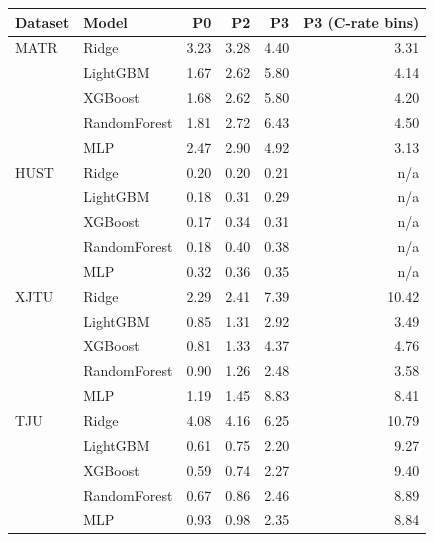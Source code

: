 \begin{tabular}{llrrrr}
\toprule
Dataset & Model & P0 & P2 & P3 & P3 (C-rate bins) \\
\midrule
MATR & Ridge & 3.23 & 3.28 & 4.40 & 3.31 \\
 & LightGBM & 1.67 & 2.62 & 5.80 & 4.14 \\
 & XGBoost & 1.68 & 2.62 & 5.80 & 4.20 \\
 & RandomForest & 1.81 & 2.72 & 6.43 & 4.50 \\
 & MLP & 2.47 & 2.90 & 4.92 & 3.13 \\
HUST & Ridge & 0.20 & 0.20 & 0.21 & n/a \\
 & LightGBM & 0.18 & 0.31 & 0.29 & n/a \\
 & XGBoost & 0.17 & 0.34 & 0.31 & n/a \\
 & RandomForest & 0.18 & 0.40 & 0.38 & n/a \\
 & MLP & 0.32 & 0.36 & 0.35 & n/a \\
XJTU & Ridge & 2.29 & 2.41 & 7.39 & 10.42 \\
 & LightGBM & 0.85 & 1.31 & 2.92 & 3.49 \\
 & XGBoost & 0.81 & 1.33 & 4.37 & 4.76 \\
 & RandomForest & 0.90 & 1.26 & 2.48 & 3.58 \\
 & MLP & 1.19 & 1.45 & 8.83 & 8.41 \\
TJU & Ridge & 4.08 & 4.16 & 6.25 & 10.79 \\
 & LightGBM & 0.61 & 0.75 & 2.20 & 9.27 \\
 & XGBoost & 0.59 & 0.74 & 2.27 & 9.40 \\
 & RandomForest & 0.67 & 0.86 & 2.46 & 8.89 \\
 & MLP & 0.93 & 0.98 & 2.35 & 8.84 \\
\bottomrule
\end{tabular}
